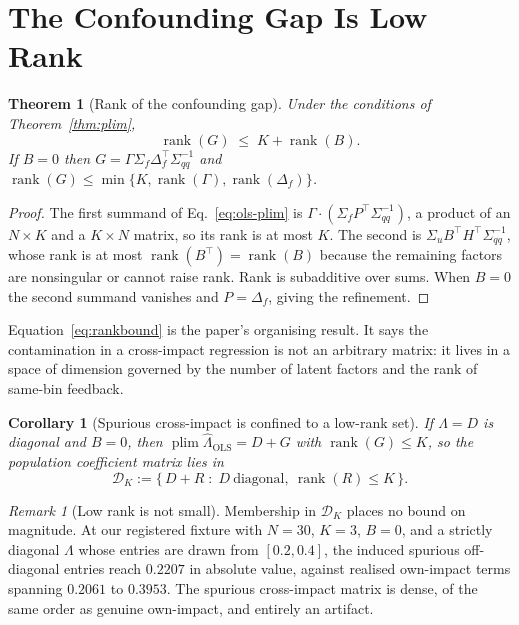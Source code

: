\documentclass[10pt,twocolumn]{article}
\newtheorem{theorem}{Theorem}
\newtheorem{corollary}{Corollary}
\theoremstyle{remark}
\newtheorem{remark}{Remark}
\newcommand{\plim}{\operatorname{plim}}
\newcommand{\rank}{\operatorname{rank}}
\begin{document}
\section{The Confounding Gap Is Low Rank}
\label{sec:rank}

\begin{theorem}[Rank of the confounding gap]
\label{thm:rank}
Under the conditions of Theorem~\ref{thm:plim},
\begin{equation}
\rank(G)\;\le\;K+\rank(B). \label{eq:rankbound}
\end{equation}
If $B=0$ then $G=\Gamma\Sigma_f\Delta_f^\top\Sigma_{qq}^{-1}$ and
$\rank(G)\le\min\{K,\rank(\Gamma),\rank(\Delta_f)\}$.
\end{theorem}

\begin{proof}
The first summand of Eq.~\eqref{eq:ols-plim} is
$\Gamma\cdot(\Sigma_fP^\top\Sigma_{qq}^{-1})$, a product of an $N\times K$ and
a $K\times N$ matrix, so its rank is at most $K$. The second is
$\Sigma_uB^\top H^\top\Sigma_{qq}^{-1}$, whose rank is at most
$\rank(B^\top)=\rank(B)$ because the remaining factors are nonsingular or
cannot raise rank. Rank is subadditive over sums. When $B=0$ the second
summand vanishes and $P=\Delta_f$, giving the refinement.
\end{proof}

Equation~\eqref{eq:rankbound} is the paper's organising result. It says the
contamination in a cross-impact regression is not an arbitrary matrix: it lives
in a space of dimension governed by the number of latent factors and the rank
of same-bin feedback.

\begin{corollary}[Spurious cross-impact is confined to a low-rank set]
\label{cor:set}
If $\Lambda=D$ is diagonal and $B=0$, then $\plim\widehat\Lambda_{\mathrm{OLS}}
= D+G$ with $\rank(G)\le K$, so the population coefficient matrix lies in
\begin{equation}
\mathcal D_K:=\{\,D+R\;:\;D\ \text{diagonal},\ \rank(R)\le K\,\}.
\label{eq:dk}
\end{equation}
\end{corollary}

\begin{remark}[Low rank is not small]
\label{rem:magnitude}
Membership in $\mathcal D_K$ places no bound on magnitude. At our registered
fixture with $N=30$, $K=3$, $B=0$, and a strictly diagonal $\Lambda$ whose
entries are drawn from $[0.2,0.4]$, the induced spurious off-diagonal entries
reach $0.2207$ in absolute value, against realised own-impact terms spanning
$0.2061$ to $0.3953$. The spurious cross-impact matrix is dense, of the same
order as genuine own-impact, and entirely an artifact.
\end{remark}
\end{document}
